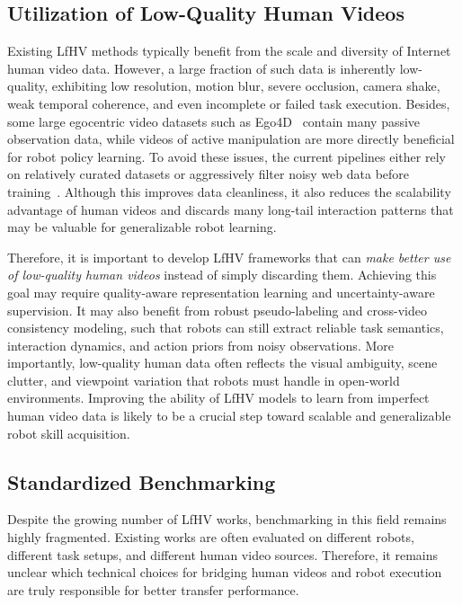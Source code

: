 \documentclass[Afour,sageh,times]{sagej}
\begin{document}
\subsection{Utilization of Low-Quality Human Videos}

Existing LfHV methods typically benefit from the scale and diversity of Internet human video data. However, a large fraction of such data is inherently low-quality, exhibiting low resolution, motion blur, severe occlusion, camera shake, weak temporal coherence, and even incomplete or failed task execution. Besides, some large egocentric video datasets such as Ego4D~\citep{grauman2022ego4d} contain many passive observation data, while videos of active manipulation are more directly beneficial for robot policy learning. To avoid these issues, the current pipelines either rely on relatively curated datasets or aggressively filter noisy web data before training~\citep{chen2024igor,cheang2024gr,cheang2025gr,zhao2025dexh2r,bjorck2025gr00t,luo2026joint}. Although this improves data cleanliness, it also reduces the scalability advantage of human videos and discards many long-tail interaction patterns that may be valuable for generalizable robot learning.

Therefore, it is important to develop LfHV frameworks that can \textit{make better use of low-quality human videos} instead of simply discarding them. Achieving this goal may require quality-aware representation learning and uncertainty-aware supervision. It may also benefit from robust pseudo-labeling and cross-video consistency modeling, such that robots can still extract reliable task semantics, interaction dynamics, and action priors from noisy observations. More importantly, low-quality human data often reflects the visual ambiguity, scene clutter, and viewpoint variation that robots must handle in open-world environments. Improving the ability of LfHV models to learn from imperfect human video data is likely to be a crucial step toward scalable and generalizable robot skill acquisition.



\subsection{Standardized Benchmarking}

Despite the growing number of LfHV works, benchmarking in this field remains highly fragmented. Existing works are often evaluated on different robots, different task setups, and different human video sources. Therefore, it remains unclear which technical choices for bridging human videos and robot execution are truly responsible for better transfer performance.
\end{document}
